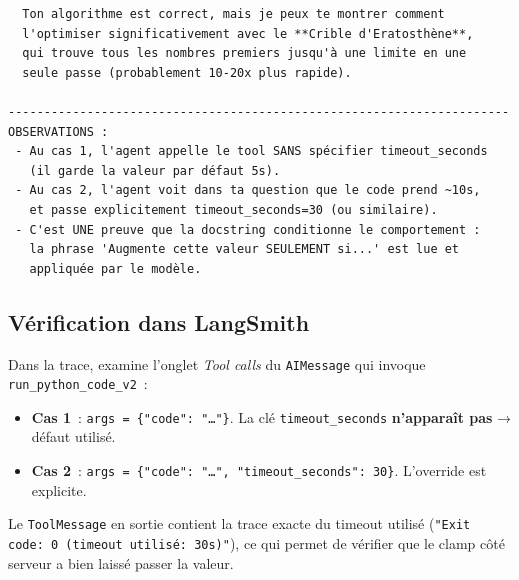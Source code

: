 \documentclass[11pt,a4paper]{article}
\begin{document}
\begin{tcolorbox}[
  colback=white,
  colframe=black!50,
  coltitle=black,
  fonttitle=\footnotesize\bfseries,
  fontupper=\footnotesize,
  title=Sortie de l'exécution,
  breakable,
]
\begin{verbatim}
  Ton algorithme est correct, mais je peux te montrer comment
  l'optimiser significativement avec le **Crible d'Eratosthène**,
  qui trouve tous les nombres premiers jusqu'à une limite en une
  seule passe (probablement 10-20x plus rapide).

----------------------------------------------------------------------
OBSERVATIONS :
 - Au cas 1, l'agent appelle le tool SANS spécifier timeout_seconds
   (il garde la valeur par défaut 5s).
 - Au cas 2, l'agent voit dans ta question que le code prend ~10s,
   et passe explicitement timeout_seconds=30 (ou similaire).
 - C'est UNE preuve que la docstring conditionne le comportement :
   la phrase 'Augmente cette valeur SEULEMENT si...' est lue et
   appliquée par le modèle.
\end{verbatim}
\end{tcolorbox}

\subsection{Vérification dans LangSmith}

Dans la trace, examine l'onglet \emph{Tool calls} du \texttt{AIMessage}
qui invoque \texttt{run\_python\_code\_v2}~:

\begin{itemize}[leftmargin=*]
  \item \textbf{Cas 1}~: \texttt{args = \{"code": "\dots"\}}. La clé
        \texttt{timeout\_seconds} \textbf{n'apparaît pas} → défaut utilisé.
  \item \textbf{Cas 2}~: \texttt{args = \{"code": "\dots", "timeout\_seconds": 30\}}.
        L'override est explicite.
\end{itemize}

Le \texttt{ToolMessage} en sortie contient la trace exacte du timeout
utilisé (\texttt{"Exit code: 0 (timeout utilisé: 30s)"}), ce qui permet
de vérifier que le clamp côté serveur a bien laissé passer la valeur.
\end{document}
